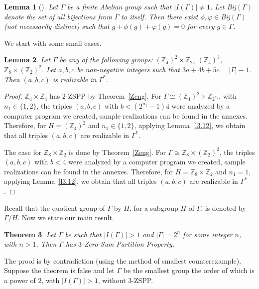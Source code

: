 \documentclass[final]{dmtcs-episciences}
\newtheorem{thm}{Theorem}[section]
\newtheorem{lem}[thm]{Lemma}
\newcommand{\zet}{\mathbb{Z}}
\begin{document}
\begin{lem}[\citet{CicZ,Zeng}]\label{bijection}
Let $\Gamma$ be a finite Abelian group such that $|I(\Gamma)|\neq 1$. Let Bij$(\Gamma)$ denote the set of all bijections from $\Gamma$ to itself. Then there exist $\phi,\varphi\in$Bij$(\Gamma)$ (not necessarily distinct) such that $g+\phi(g)+\varphi(g)=0$  for every $g\in\Gamma$. %
\end{lem}

We start with some small cases.

\begin{lem}\label{male2} Let $\Gamma$ be any of the following groups: $(\zet_4)^2\times \zet_2$, $(\zet_4)^3$, $\zet_8\times (\zet_2)^2$. Let $a,b,c$ be non-negative integers such that $3a+4b+5c=|\Gamma|-1$. Then $(a,b,c)$ is realizable in $\Gamma^*$. \end{lem}

\begin{proof}
$\zet_4\times\zet_4$ has $2$-ZSPP by Theorem~\ref{Zeng}. For $\Gamma\cong(\zet_4)^2\times \zet_{2^{n_1}}$, with $n_1\in\{1,2\}$, the triples $(a, b, c)$ with $b<(2^{n_1}-1)4$ were analyzed by a computer program we created, sample realizations can be found in the annexes. Therefore, for $H =(\zet_4)^2$ and $n_1\in\{1,2\}$, applying Lemma~\ref{l3.12}, we obtain that all triples $(a,b,c)$ are realizable in $\Gamma^*$.

The case for $\zet_8\times\zet_2$ is done by Theorem~\ref{Zeng}. For $\Gamma\cong\zet_8\times (\zet_2)^2$, the triples $(a, b, c)$ with $b<4$ were analyzed by a computer program we created, sample realizations can be found in the annexes. Therefore, for $H =\zet_8\times\zet_2$ and  $n_1=1$, applying Lemma~\ref{l3.12}, we obtain that all triples $(a,b,c)$ are realizable in $\Gamma^*$.
\end{proof}

Recall that the quotient group of $\Gamma$ by $H$, for a subgroup $H$ of $\Gamma$, is denoted by $\Gamma/H$.
Now we state our main result.
\begin{thm}Let $\Gamma$ be such that $|I(\Gamma)|>1$ and $|\Gamma|=2^n$ for some integer $n$, with $n>1$. Then $\Gamma$ has $3$-Zero-Sum Partition Property.\label{mainSK}
\end{thm}

The proof is  by contradiction (using the method
of smallest counterexample). Suppose the theorem is false and let $\Gamma$ be the smallest group the order of which is a power of $2$, with $|I(\Gamma)|>1$, without $3$-ZSPP.
\end{document}
